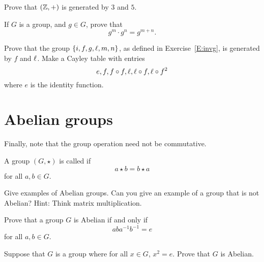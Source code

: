 \documentclass{ximera}
\begin{document}
\begin{exercise}
  Prove that $(\mathbb Z,+)$ is generated by $3$ and $5$.
\end{exercise}

\begin{exercise}
  If $G$ is a group, and $g\in G$, prove that
  \[
  g^m\cdot g^n = g^{m+n}.
  \]
\end{exercise}



\begin{exercise}
  Prove that the group $\{i,f,g,\ell,m,n\}$, as defined in
  Exercise~\ref{E:invg}, is generated by $f$ and $\ell$. Make a Cayley
  table with entries
  \[
  e, f, f\circ f, \ell, \ell\circ f,\ell \circ f^2
  \]
  where $e$ is the identity function.
\end{exercise}


\section{Abelian groups}


Finally, note that the group operation need not be commutative.

\begin{definition}
  A group $(G,\star)$ is called  if
  \[
  a\star b = b\star a
  \]
  for all $a,b\in G$.
\end{definition}

\begin{exercise}
  Give examples of Abelian groups. Can you give an example of a group
  that is not Abelian? Hint: Think matrix multiplication.
\end{exercise}

\begin{exercise}
  Prove that a group $G$ is Abelian if and only if
  \[
  aba^{-1}b^{-1} = e
  \]
  for all $a,b\in G$.
\end{exercise}


\begin{exercise}
  Suppose that $G$ is a group where for all $x\in G$, $x^2 =e$. Prove
  that $G$ is Abelian.
\end{exercise}





\end{document}
